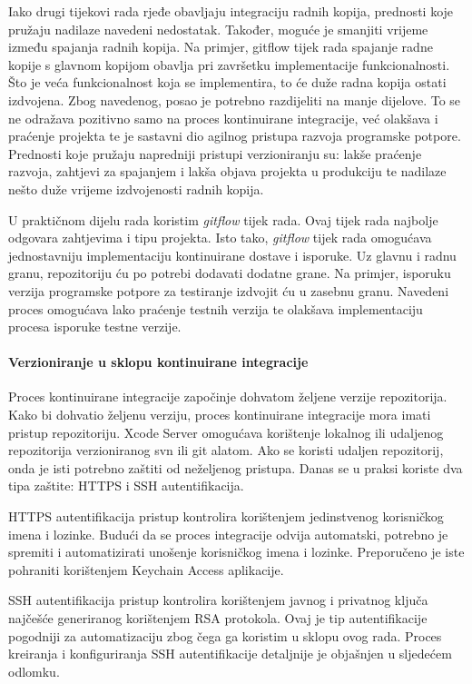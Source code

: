 \documentclass[times, utf8, diplomski, numeric]{fer}
\begin{document}
Iako drugi tijekovi rada rjeđe obavljaju integraciju radnih kopija, prednosti koje pružaju nadilaze navedeni nedostatak. Također, moguće je smanjiti vrijeme između spajanja radnih kopija. Na primjer, gitflow tijek rada spajanje radne kopije s glavnom kopijom obavlja pri završetku implementacije funkcionalnosti. Što je veća funkcionalnost koja se implementira, to će duže radna kopija ostati izdvojena. Zbog navedenog, posao je potrebno razdijeliti na manje dijelove. To se ne odražava pozitivno samo na proces kontinuirane integracije, već olakšava i praćenje projekta te je sastavni dio agilnog pristupa razvoja programske potpore. Prednosti koje pružaju napredniji pristupi verzioniranju su: lakše praćenje razvoja, zahtjevi za spajanjem i lakša objava projekta u produkciju te nadilaze nešto duže vrijeme izdvojenosti radnih kopija.

U praktičnom dijelu rada koristim \textit{gitflow} tijek rada. Ovaj tijek rada najbolje odgovara zahtjevima i tipu projekta. Isto tako, \textit{gitflow} tijek rada omogućava jednostavniju implementaciju kontinuirane dostave i isporuke. Uz glavnu i radnu granu, repozitoriju ću po potrebi dodavati dodatne grane. Na primjer, isporuku verzija programske potpore za testiranje izdvojit ću u zasebnu granu. Navedeni proces omogućava lako praćenje testnih verzija te olakšava implementaciju procesa isporuke testne verzije.

\paragraph{Verzioniranje u sklopu kontinuirane integracije}

Proces kontinuirane integracije započinje dohvatom željene verzije repozitorija. Kako bi dohvatio željenu verziju, proces kontinuirane integracije mora imati pristup repozitoriju. Xcode Server omogućava korištenje lokalnog ili udaljenog repozitorija verzioniranog svn ili git alatom. Ako se koristi udaljen repozitorij, onda je isti potrebno zaštiti od neželjenog pristupa. Danas se u praksi koriste dva tipa zaštite: HTTPS i SSH autentifikacija.

HTTPS autentifikacija pristup kontrolira korištenjem jedinstvenog korisničkog imena i lozinke. Budući da se proces integracije odvija automatski, potrebno je spremiti i automatizirati unošenje korisničkog imena i lozinke. Preporučeno je iste pohraniti korištenjem Keychain Access aplikacije.

SSH autentifikacija pristup kontrolira korištenjem javnog i privatnog ključa najčešće generiranog korištenjem RSA protokola. Ovaj je tip autentifikacije pogodniji za automatizaciju zbog čega ga koristim u sklopu ovog rada. Proces kreiranja i konfiguriranja SSH autentifikacije detaljnije je objašnjen u sljedećem odlomku.
\end{document}
